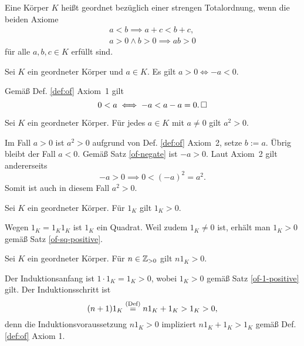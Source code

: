 \begin{Definition}\label{def:of}
Eine Körper $K$ heißt geordnet bezüglich einer strengen Totalordnung,
wenn die beiden Axiome
\begin{gather*}
a<b \implies a+c<b+c,\\
a>0\land b>0\implies ab>0
\end{gather*}
für alle $a,b,c\in K$ erfüllt sind.
\end{Definition}

\begin{Satz}\label{of-negate}
Sei $K$ ein geordneter Körper und $a\in K$. Es gilt $a>0\iff -a<0$. 
\end{Satz}
\begin{Beweis}
Gemäß Def. \ref{def:of} Axiom~1 gilt%
\[0<a \iff -a < a-a = 0.\,\square\]
\end{Beweis}

\begin{Satz}\label{of-sq-positive}
Sei $K$ ein geordneter Körper. Für jedes $a\in K$ mit $a\ne 0$ gilt
$a^2>0$.
\end{Satz}
\begin{Beweis}
Im Fall $a>0$ ist $a^2>0$ aufgrund von Def. \ref{def:of} Axiom~2, setze
$b:=a$.
Übrig bleibt der Fall $a<0$. Gemäß Satz \ref{of-negate} ist
$-a>0$. Laut Axiom~2 gilt andererseits%
\[-a > 0 \implies 0 < (-a)^2 = a^2.\]
Somit ist auch in diesem Fall $a^2>0$.\,\qedsymbol
\end{Beweis}

\begin{Satz}\label{of-1-positive}
Sei $K$ ein geordneter Körper. Für $1_K$ gilt $1_K>0$.
\end{Satz}

\begin{Beweis}
Wegen $1_K = 1_K 1_K$ ist $1_K$ ein Quadrat. Weil zudem $1_K\ne 0$ ist,
erhält man $1_K>0$ gemäß Satz \ref{of-sq-positive}.\,\qedsymbol
\end{Beweis}

\begin{Satz}
Sei $K$ ein geordneter Körper. Für $n\in\mathbb Z_{>0}$ gilt $n1_K>0$.
\end{Satz}

\begin{Beweis}
Der Induktionsanfang ist $1\cdot 1_K = 1_K > 0$, wobei $1_K>0$ gemäß
Satz \ref{of-1-positive} gilt. Der Induktionsschritt ist
\[(n+1)1_K \stackrel{\mathrm{(Def)}}{=} n1_K + 1_K > 1_K > 0,\]
denn die Induktionsvoraussetzung $n1_K>0$ impliziert
$n1_K+1_K>1_K$ gemäß Def. \ref{def:of} Axiom 1.\,\qedsymbol
\end{Beweis}

